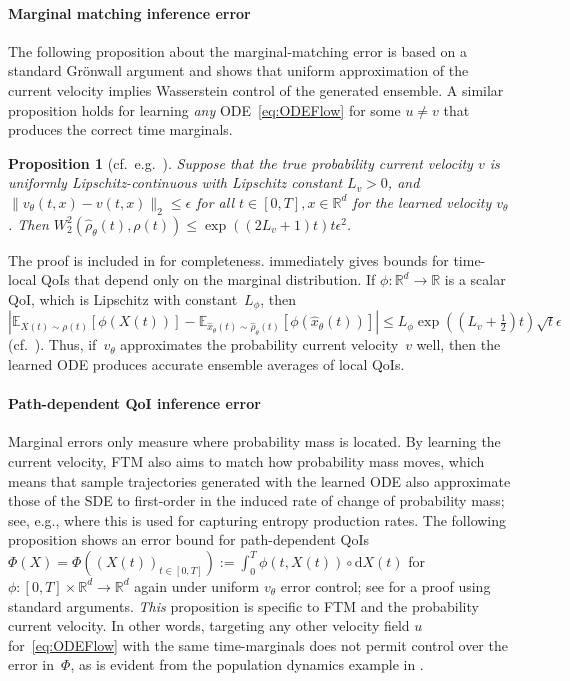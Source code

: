 \documentclass[oneside,11pt]{article}
\newtheorem{proposition}{Proposition}
\theoremstyle{remark}
\begin{document}
\paragraph{Marginal matching inference error}
The following proposition about the marginal-matching error is based on a standard Gr{\"o}nwall argument and shows that uniform approximation of the current velocity implies Wasserstein control of the generated ensemble. A similar proposition holds for learning \textit{any} ODE~\eqref{eq:ODEFlow} for some $u \neq v$ that produces the correct time marginals.

\begin{proposition}[cf.\ e.g.~\cite{albergo-vanden-eijnden:2022,benton-deligiannidis-doucet:2023,fukumizu-suzuki-isobe-etal:2024}] \label{prop:w2}
Suppose that the true probability current velocity $v$ is uniformly Lipschitz-continuous with Lipschitz constant $L_v > 0$, and $\|v_{\theta}(t,x) - v(t,x)\|_2 \leq \epsilon$ for all $t \in [0,T],x \in \mathbb{R}^d$ for the learned velocity $v_\theta$. Then $W_2^2(\hat{\rho}_\theta(t), \rho(t)) \leq \exp((2L_v+1)t)t\epsilon^2$.
\end{proposition}
The proof is included in  for completeness. 
 immediately gives bounds for time-local QoIs that depend only on the marginal distribution. If $\phi: \mathbb{R}^d \to \mathbb{R}$ is a scalar QoI, which is Lipschitz with constant~$L_{\phi}$, then $|\mathbb{E}_{X(t) \sim \rho(t)}[\phi(X(t))] - \mathbb{E}_{\hat{x}_\theta(t) \sim \hat{\rho}_\theta(t)}[\phi(\hat{x}_\theta(t))]| \leq L_{\phi}\exp((L_v + \tfrac12)t)\sqrt{t}\epsilon$ (cf.\ ). 
Thus, if~$v_{\theta}$ approximates the probability current velocity~$v$ well, then the learned ODE produces accurate ensemble averages of local QoIs.


\paragraph{Path-dependent QoI inference error}
Marginal errors only measure where probability mass is located. By learning the current velocity, FTM also aims to match how probability mass moves, which means that sample trajectories generated with the learned ODE also approximate those of the SDE to first-order in the induced rate of change of probability mass; see, e.g., \cite{boffi-vanden-eijnden:2024} where this is used for capturing entropy production rates. The following proposition shows an error bound for path-dependent QoIs $\Phi(X) = \Phi((X(t))_{t \in [0,T]}):= \int_0^T \phi(t,X(t)) \circ \mathrm{d}X(t)$ for $\phi \colon [0,T] \times \mathbb{R}^d \to \mathbb{R}^d$ again under uniform $v_{\theta}$ error control; see  for a proof using standard arguments. \textit{This} proposition is specific to FTM and the probability current velocity. In other words, targeting any other velocity field $u$ for~\eqref{eq:ODEFlow} with the same time-marginals does not permit control over the error in~$\Phi$, as is evident from the population dynamics example in .
\end{document}
